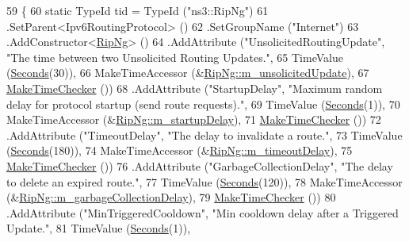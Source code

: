 \begin{DoxyCode}
59 \{
60   \textcolor{keyword}{static} TypeId tid = TypeId (\textcolor{stringliteral}{"ns3::RipNg"})
61     .SetParent<Ipv6RoutingProtocol> ()
62     .SetGroupName (\textcolor{stringliteral}{"Internet"})
63     .AddConstructor<\hyperlink{classns3_1_1RipNg_aa7816865151af06b32f54f67e156f9d4}{RipNg}> ()
64     .AddAttribute (\textcolor{stringliteral}{"UnsolicitedRoutingUpdate"}, \textcolor{stringliteral}{"The time between two Unsolicited Routing Updates."},
65                    TimeValue (\hyperlink{group__timecivil_ga33c34b816f8ff6628e33d5c8e9713b9e}{Seconds}(30)),
66                    MakeTimeAccessor (&\hyperlink{classns3_1_1RipNg_a8bedf450622f395cc52c1d37dc4d7a40}{RipNg::m\_unsolicitedUpdate}),
67                    \hyperlink{group__time_ga7032965bd4afa578691d88c09e4481c1}{MakeTimeChecker} ())
68     .AddAttribute (\textcolor{stringliteral}{"StartupDelay"}, \textcolor{stringliteral}{"Maximum random delay for protocol startup (send route requests)."},
69                    TimeValue (\hyperlink{group__timecivil_ga33c34b816f8ff6628e33d5c8e9713b9e}{Seconds}(1)),
70                    MakeTimeAccessor (&\hyperlink{classns3_1_1RipNg_a11c536612cb48e139d4a3b8d34c9ec3a}{RipNg::m\_startupDelay}),
71                    \hyperlink{group__time_ga7032965bd4afa578691d88c09e4481c1}{MakeTimeChecker} ())
72     .AddAttribute (\textcolor{stringliteral}{"TimeoutDelay"}, \textcolor{stringliteral}{"The delay to invalidate a route."},
73                    TimeValue (\hyperlink{group__timecivil_ga33c34b816f8ff6628e33d5c8e9713b9e}{Seconds}(180)),
74                    MakeTimeAccessor (&\hyperlink{classns3_1_1RipNg_aed45845b278332b589e76304a3701d72}{RipNg::m\_timeoutDelay}),
75                    \hyperlink{group__time_ga7032965bd4afa578691d88c09e4481c1}{MakeTimeChecker} ())
76     .AddAttribute (\textcolor{stringliteral}{"GarbageCollectionDelay"}, \textcolor{stringliteral}{"The delay to delete an expired route."},
77                    TimeValue (\hyperlink{group__timecivil_ga33c34b816f8ff6628e33d5c8e9713b9e}{Seconds}(120)),
78                    MakeTimeAccessor (&\hyperlink{classns3_1_1RipNg_aa42bd385be7a330206d02e2e721edc19}{RipNg::m\_garbageCollectionDelay}),
79                    \hyperlink{group__time_ga7032965bd4afa578691d88c09e4481c1}{MakeTimeChecker} ())
80     .AddAttribute (\textcolor{stringliteral}{"MinTriggeredCooldown"}, \textcolor{stringliteral}{"Min cooldown delay after a Triggered Update."},
81                    TimeValue (\hyperlink{group__timecivil_ga33c34b816f8ff6628e33d5c8e9713b9e}{Seconds}(1)),

\end{DoxyCode}
